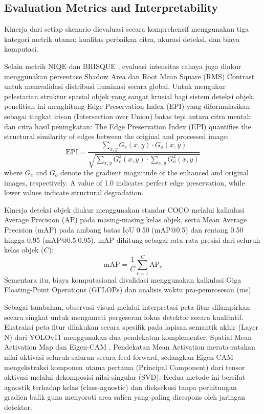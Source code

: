 \documentclass[conference]{IEEEtran}
\begin{document}
\subsection{Evaluation Metrics and Interpretability}
Kinerja dari setiap skenario dievaluasi secara komprehensif menggunakan tiga kategori metrik utama: kualitas perbaikan citra, akurasi deteksi, dan biaya komputasi. 

Selain metrik NIQE \cite{mittal2013niqe} dan BRISQUE \cite{mittal2012brisque}, evaluasi intensitas cahaya juga diukur menggunakan persentase Shadow Area dan Root Mean Square (RMS) Contrast untuk memvalidasi distribusi iluminasi secara global. Untuk mengukur pelestarian struktur spasial objek yang sangat krusial bagi sistem deteksi objek, penelitian ini menghitung Edge Preservation Index (EPI) yang diformulasikan sebagai tingkat irisan (Intersection over Union) batas tepi antara citra mentah dan citra hasil peningkatan:
The Edge Preservation Index (EPI) quantifies the structural similarity
of edges between the original and processed image:
\begin{equation}
  \text{EPI} = \frac{\sum_{x,y} G_e(x,y) \cdot G_o(x,y)}
                    {\sqrt{\sum_{x,y} G_e^2(x,y) \cdot \sum_{x,y} G_o^2(x,y)}}
\end{equation}
where $G_e$ and $G_o$ denote the gradient magnitude of the enhanced and
original images, respectively. A value of 1.0 indicates perfect edge
preservation, while lower values indicate structural degradation.


Kinerja deteksi objek diukur menggunakan standar COCO \cite{padilla2021metrics} melalui kalkulasi Average Precision (AP) pada masing-masing kelas objek, serta Mean Average Precision (mAP) pada ambang batas IoU 0.50 (mAP@0.5) dan rentang 0.50 hingga 0.95 (mAP@0.5:0.95). mAP dihitung sebagai rata-rata presisi dari seluruh kelas objek ($C$):
\begin{equation}
\text{mAP} = \frac{1}{C} \sum_{c=1}^{C} \text{AP}_c
\end{equation}
Sementara itu, biaya komputasional divalidasi menggunakan kalkulasi Giga Floating-Point Operations (GFLOPs) \cite{akavaram2025flops} dan analisis waktu pra-pemrosesan (ms).

Sebagai tambahan, observasi visual melalui interpretasi peta fitur dilampirkan secara singkat untuk mengamati pergeseran fokus detektor secara kualitatif. Ekstraksi peta fitur dilakukan secara spesifik pada lapisan semantik akhir (Layer N) dari YOLOv11 menggunakan dua pendekatan komplementer: Spatial Mean Activation Map dan Eigen-CAM \cite{muhammad2020eigencam}. Pendekatan Mean Activation merata-ratakan nilai aktivasi seluruh saluran secara feed-forward, sedangkan Eigen-CAM mengekstraksi komponen utama pertama (Principal Component) dari tensor aktivasi melalui dekomposisi nilai singular (SVD). Kedua metode ini bersifat agnostik terhadap kelas (class-agnostic) dan dieksekusi tanpa perhitungan gradien balik guna menyoroti area salien yang paling direspons oleh jaringan detektor.
\end{document}
